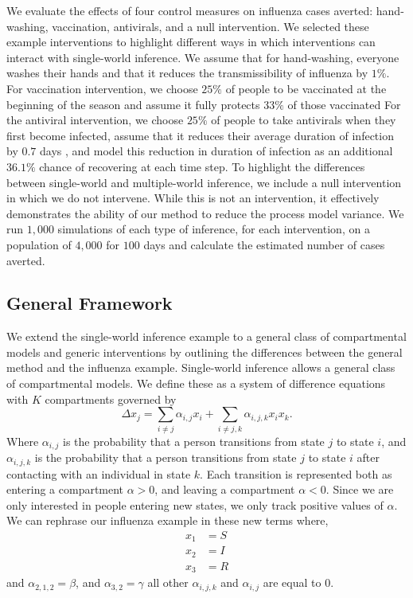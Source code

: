 \documentclass[PTRSB]{rsos}
\begin{document}
We evaluate the effects of four control measures on influenza cases averted: hand-washing, vaccination, antivirals, and a null intervention.
We selected these example interventions to highlight different ways in which interventions can interact with single-world inference.
We assume that for hand-washing, everyone washes their hands and that it reduces the transmissibility of influenza by $1\%$.
For vaccination intervention, we choose $25\%$ of people to be vaccinated at the beginning of the season and assume it fully protects $33\%$ of those vaccinated
For the antiviral intervention, we choose $25\%$ of people to take antivirals when they first become infected, assume that it reduces their average duration of infection by $0.7$ days \cite{oseltamivir:2014}, and model this reduction in duration of infection as an additional $36.1\%$ chance of recovering at each time step.
To highlight the differences between single-world and multiple-world inference, we include a null intervention in which we do not intervene.
While this is not an intervention, it effectively demonstrates the ability of our method to reduce the process model variance.
We run $1,000$ simulations of each type of inference, for each intervention, on a population of $4,000$ for $100$ days and calculate the estimated number of cases averted.

\subsection{General Framework}\label{subsection:general}

We extend the single-world inference example to a general class of compartmental models and generic interventions by outlining the differences between the general method and the influenza example.
Single-world inference allows a general class of compartmental models. 
We define these as a system of difference equations with $K$ compartments governed by \[\Delta x_{j} = \sum_{i \neq j} \alpha_{i,j}x_i + \sum_{i \neq j, k} \alpha_{i,j,k} x_ix_k.\]
Where $\alpha_{i,j}$ is the probability that a person transitions from state $j$ to state $i$, and $\alpha_{i,j,k}$ is the probability that a person transitions from state $j$ to state $i$ after contacting with an individual in state $k$.
Each transition is represented both as entering a compartment $\alpha > 0$, and leaving a compartment $\alpha < 0$.
Since we are only interested in people entering new states, we only track positive values of $\alpha$.
We can rephrase our influenza example in these new terms where,
\begin{align*}
    x_1 &= S \\
    x_2 &= I \\
    x_3 &= R
\end{align*}
and $\alpha_{2,1,2} = \beta $, and $\alpha_{3,2} = \gamma$ all other $\alpha_{i,j,k}$ and $\alpha_{i,j}$ are equal to $0$.
\end{document}
